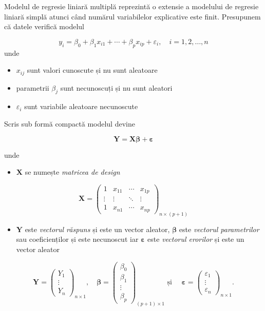 \documentclass[]{article}
\providecommand{\tightlist}{%
  \setlength{\itemsep}{0pt}\setlength{\parskip}{0pt}}
\begin{document}
Modelul de regresie liniară multiplă reprezintă o extensie a modelului
de regresie liniară simplă atunci când numărul variabilelor explicative
este finit. Presupunem că datele verifică modelul

\[
  y_i = \beta_0 + \beta_1 x_{i1} + \cdots + \beta_p x_{ip} + \varepsilon_i, \quad i = 1,2,\ldots,n
\] unde

\begin{itemize}
\item
  \(x_{ij}\) sunt valori cunoscute și nu sunt aleatoare
\item
  parametrii \(\beta_j\) sunt necunoscuți și nu sunt aleatori
\item
  \(\varepsilon_i\) sunt variabile aleatoare necunoscute
\end{itemize}

Scris sub formă compactă modelul devine

\[
  \boldsymbol Y = \boldsymbol X\boldsymbol \beta + \boldsymbol \varepsilon
\]

unde

\begin{itemize}
\tightlist
\item
  \(\mathbf{X}\) se numește \emph{matricea de design}
\end{itemize}

\[
\mathbf{X}=\begin{pmatrix}
1 & x_{11} & \cdots & x_{1p}\\
\vdots & \vdots & \ddots & \vdots\\
1 & x_{n1} & \cdots & x_{np}
\end{pmatrix}_{n\times(p+1)}
\]

\begin{itemize}
\tightlist
\item
  \(\mathbf{Y}\) este \emph{vectorul răspuns} și este un vector aleator,
  \(\boldsymbol\beta\) este \emph{vectorul parametrilor} sau
  coeficienților și este necunoscut iar \(\boldsymbol\varepsilon\) este
  \emph{vectorul erorilor} și este un vector aleator
\end{itemize}

\[
\mathbf{Y}=\begin{pmatrix}
Y_1 \\
\vdots \\
Y_n
\end{pmatrix}_{n\times 1},\quad\boldsymbol\beta=\begin{pmatrix}
\beta_0 \\
\beta_1 \\
\vdots \\
\beta_p
\end{pmatrix}_{(p+1)\times 1}\text{ și }\quad
\boldsymbol\varepsilon=\begin{pmatrix}
\varepsilon_1 \\
\vdots \\
\varepsilon_n
\end{pmatrix}_{n\times 1}.
\]
\end{document}
